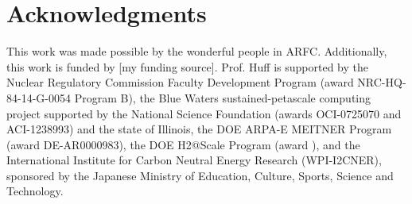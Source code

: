 \section{Acknowledgments}

This work was made possible by the wonderful people in ARFC. Additionally,
this work is funded by [my funding source].
Prof. Huff is supported by the Nuclear Regulatory Commission Faculty
Development Program (award NRC-HQ-84-14-G-0054 Program B), the Blue Waters
sustained-petascale computing project supported by the National Science
Foundation (awards OCI-0725070 and ACI-1238993) and the state of Illinois,
the DOE ARPA-E MEITNER Program (award DE-AR0000983), the DOE H2@Scale
Program (award ), and the International Institute for Carbon Neutral Energy
Research (WPI-I2CNER), sponsored by the Japanese Ministry of Education,
Culture, Sports, Science and Technology.
